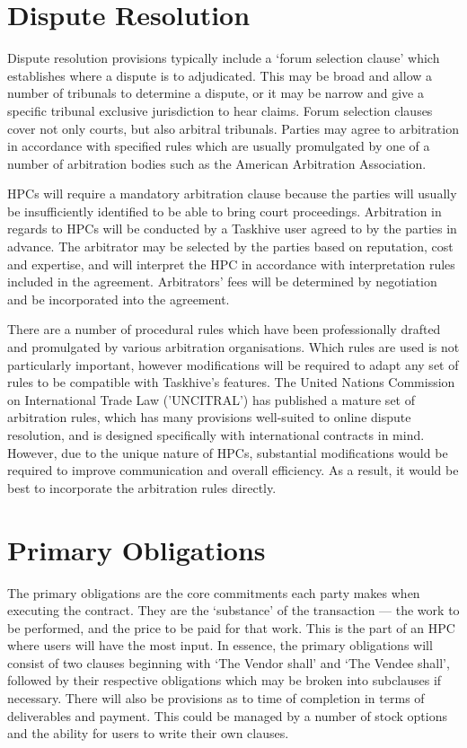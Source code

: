 \documentclass[a4paper,12pt]{article}
\begin{document}
\section{Dispute Resolution}

Dispute resolution provisions typically include a `forum selection clause' which establishes where a dispute is to adjudicated. This may be broad and allow a number of tribunals to determine a dispute, or it may be narrow and give a specific tribunal exclusive jurisdiction to hear claims. Forum selection clauses cover not only courts, but also arbitral tribunals. Parties may agree to arbitration in accordance with specified rules which are usually promulgated by one of a number of arbitration bodies such as the American Arbitration Association.

HPCs will require a mandatory arbitration clause because the parties will usually be insufficiently identified to be able to bring court proceedings. Arbitration in regards to HPCs will be conducted by a Taskhive user agreed to by the parties in advance. The arbitrator may be selected by the parties based on reputation, cost and expertise, and will interpret the HPC in accordance with interpretation rules included in the agreement. Arbitrators' fees will be determined by negotiation and be incorporated into the agreement.

There are a number of procedural rules which have been professionally drafted and promulgated by various arbitration organisations. Which rules are used is not particularly important, however modifications will be required to adapt any set of rules to be compatible with Taskhive's features. The United Nations Commission on International Trade Law ('UNCITRAL') has published a mature set of arbitration rules, which has many provisions well-suited to online dispute resolution, and is designed specifically with international contracts in mind. However, due to the unique nature of HPCs, substantial modifications would be required to improve communication and overall efficiency. As a result, it would be best to incorporate the arbitration rules directly.

\section{Primary Obligations}

The primary obligations are the core commitments each party makes when executing the contract. They are the `substance' of the transaction --- the work to be performed, and the price to be paid for that work. This is the part of an HPC where users will have the most input. In essence, the primary obligations will consist of two clauses beginning with `The Vendor shall' and `The Vendee shall', followed by their respective obligations which may be broken into subclauses if necessary. There will also be provisions as to time of completion in terms of deliverables and payment. This could be managed by a number of stock options and the ability for users to write their own clauses.
\end{document}

